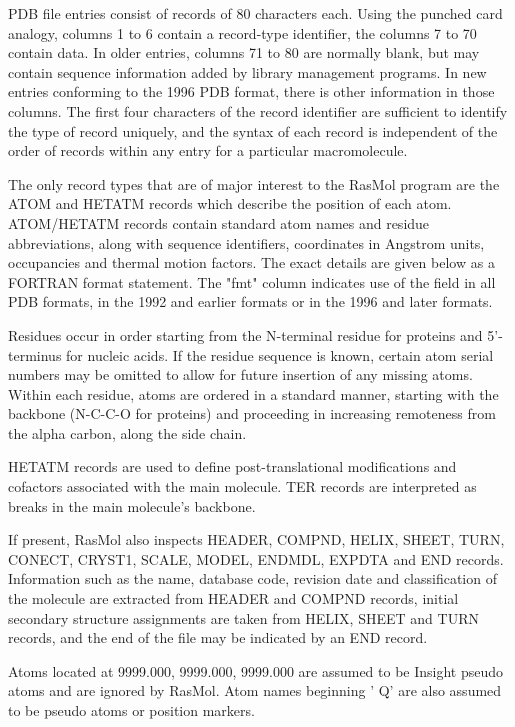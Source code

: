 PDB file entries consist of records of 80 characters each. Using the
punched card analogy, columns 1 to 6 contain a record-type identifier,
the columns 7 to 70 contain data. In older entries, columns 71 to 80
are normally blank,
but may contain sequence information added by library management
programs.  In new entries conforming to the 1996 PDB format, there
is other information in those columns. The first four characters of
the record identifier are
sufficient to identify the type of record uniquely, and the syntax of
each record is independent of the order of records within any entry for
a particular macromolecule.

The only record types that are of major interest to the RasMol program
are the ATOM and HETATM records which describe the position of each
atom. ATOM/HETATM records contain standard atom names and residue
abbreviations, along with sequence identifiers, coordinates in
Angstrom units, occupancies and thermal motion factors. The exact
details are given below as a FORTRAN format statement.  The "fmt"
column indicates use of the field in all PDB formats,
in the 1992 and earlier formats or in the 1996 and later formats.

Residues occur in order starting from the N-terminal residue
for proteins and
5'-terminus for nucleic acids. If the residue sequence is known,
certain atom serial numbers may be omitted to allow for future insertion
of any missing atoms. Within each residue, atoms are ordered in a
standard manner, starting with the backbone (N-C-C-O for proteins) and
proceeding in increasing remoteness from the alpha carbon, along the
side chain.

HETATM records are used to define post-translational modifications and
cofactors associated with the main molecule. TER records are
interpreted as breaks in the main molecule's backbone.

If present, RasMol also inspects HEADER, COMPND, HELIX, SHEET, TURN,
CONECT, CRYST1, SCALE, MODEL, ENDMDL, EXPDTA and END records. Information such as the
name, database code, revision date and classification of the molecule
are extracted from HEADER and COMPND records, initial secondary
structure assignments are taken from HELIX, SHEET and TURN records, and
the end of the file may be indicated by an END record.

Atoms located at 9999.000, 9999.000, 9999.000 are assumed to be Insight
pseudo atoms and are ignored by RasMol. Atom names beginning ' Q' are
also assumed to be pseudo atoms or position markers.

